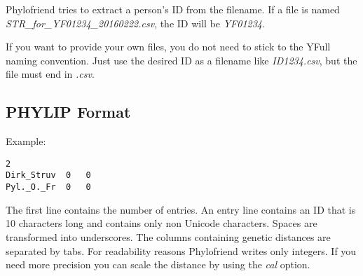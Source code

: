 Phylofriend tries to extract a person's ID from the filename. If
a file is named \emph{STR\_for\_YF01234\_20160222.csv}, the ID
will be \emph{YF01234}.

If you want to provide your own files, you do not need to stick
to the YFull naming convention. Just use the desired ID as a
filename like \emph{ID1234.csv}, but the file must end in 
\emph{.csv}.


\subsection{PHYLIP Format}

Example:

\begin{verbatim}
2
Dirk_Struv	0	0
Pyl._O._Fr	0	0
\end{verbatim}

The first line contains the number of entries. An entry
line contains an ID that is 10 characters long and contains
only non Unicode characters. Spaces are transformed into
underscores. The columns containing genetic distances
are separated by tabs. For readability reasons
Phylofriend writes only integers. If you need more precision
you can scale the distance by using the \emph{cal} option.







